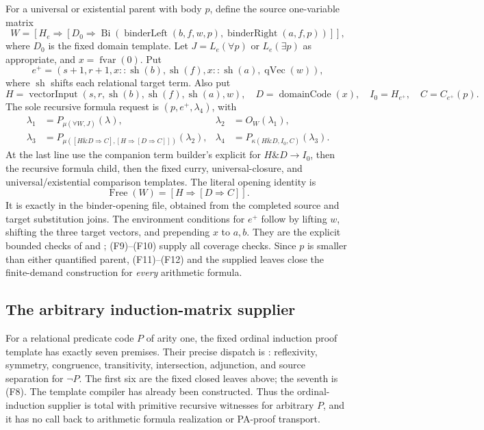 For a universal or existential parent with body $p$, define the
source one-variable matrix
\[
 W=[H_e\Rightarrow[D_0\Rightarrow
            \operatorname{Bi}(\operatorname{binderLeft}(b,f,w,p),
                              \operatorname{binderRight}(a,f,p))]],
\]
where $D_0$ is the fixed domain template.  Let
$J=L_e(\forall p)$ or $L_e(\exists p)$ as appropriate, and
$x=\operatorname{fvar}(0)$.  Put
\[
 e^+=(s+1,r+1,x::\operatorname{sh}(b),\operatorname{sh}(f),
                   x::\operatorname{sh}(a),\operatorname{qVec}(w)),
\]
where $\operatorname{sh}$ shifts each relational target term.
Also put
\[
 H=\operatorname{vectorInput}(s,r,\operatorname{sh}(b),
       \operatorname{sh}(f),\operatorname{sh}(a),w),\quad
 D=\operatorname{domainCode}(x),\quad I_0=H_{e^+},\quad C=C_{e^+}(p).
\]
The sole recursive formula request is $(p,e^+,\lambda_4)$, with
\begin{align*}
 \lambda_1&=P_{\mu(\forall W,J)}(\lambda),&
 \lambda_2&=O_W(\lambda_1),\\
 \lambda_3&=P_{\mu([H\mathbin\&D\Rightarrow C],
                           [H\Rightarrow[D\Rightarrow C]])}(\lambda_2),&
 \lambda_4&=P_{\kappa(H\mathbin\&D,I_0,C)}(\lambda_3).
 \tag{F12}
\end{align*}
At the last line use the companion term builder's explicit
 for
$H\mathbin\&D\to I_0$, then the recursive formula child,
then the fixed curry, universal-closure, and universal/existential
comparison templates.  The literal opening identity is
\[
 \operatorname{Free}(W)=[H\Rightarrow[D\Rightarrow C]].
\]
It is exactly  in the binder-opening
file, obtained from the completed source and target substitution
joins.  The environment conditions for $e^+$ follow by lifting
$w$, shifting the three target vectors, and prepending $x$ to $a,b$.
They are the explicit bounded checks of
 and
; (F9)--(F10) supply all coverage
checks.  Since $p$ is smaller than either quantified parent,
(F11)--(F12) and the supplied leaves close the finite-demand
construction for \emph{every} arithmetic formula.

\subsection{The arbitrary induction-matrix supplier}

For a relational predicate code $P$ of arity one, the fixed ordinal
induction proof template has exactly seven premises.  Their precise
dispatch is 
: reflexivity, symmetry,
congruence, transitivity, intersection, adjunction, and source
separation for $\neg P$.  The first six are the fixed closed leaves
above; the seventh is (F8).  The template compiler has already been
constructed.  Thus the ordinal-induction supplier is total with
primitive recursive witnesses for arbitrary $P$, and it has no
call back to arithmetic formula realization or PA-proof transport.

